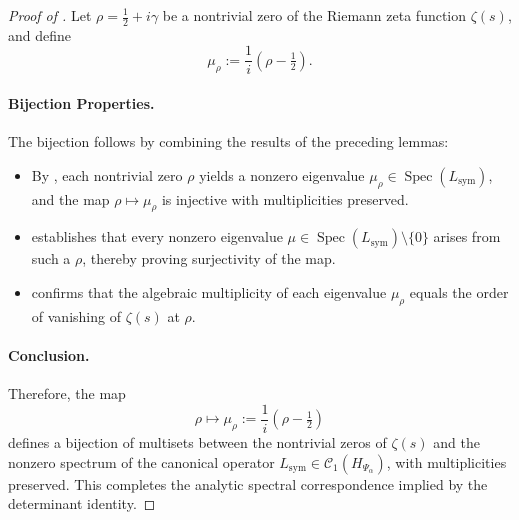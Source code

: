 \begin{proof}[Proof of ]
Let \( \rho = \tfrac{1}{2} + i\gamma \) be a nontrivial zero of the Riemann zeta function \( \zeta(s) \), and define
\[
\mu_\rho := \frac{1}{i}(\rho - \tfrac{1}{2}).
\]

\paragraph{Bijection Properties.}
The bijection follows by combining the results of the preceding lemmas:

\begin{itemize}
  \item By , each nontrivial zero \( \rho \) yields a nonzero eigenvalue \( \mu_\rho \in \operatorname{Spec}(L_{\mathrm{sym}}) \), and the map \( \rho \mapsto \mu_\rho \) is injective with multiplicities preserved.

  \item {} establishes that every nonzero eigenvalue \( \mu \in \operatorname{Spec}(L_{\mathrm{sym}}) \setminus \{0\} \) arises from such a \( \rho \), thereby proving surjectivity of the map.

  \item {} confirms that the algebraic multiplicity of each eigenvalue \( \mu_\rho \) equals the order of vanishing of \( \zeta(s) \) at \( \rho \).
\end{itemize}

\paragraph{Conclusion.}
Therefore, the map
\[
\rho \longmapsto \mu_\rho := \frac{1}{i}(\rho - \tfrac{1}{2})
\]
defines a bijection of multisets between the nontrivial zeros of \( \zeta(s) \) and the nonzero spectrum of the canonical operator \( L_{\mathrm{sym}} \in \mathcal{C}_1(H_{\Psi_\alpha}) \), with multiplicities preserved. This completes the analytic spectral correspondence implied by the determinant identity.
\end{proof}
